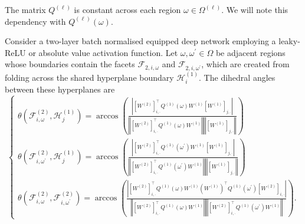 The matrix $Q^{(\ell)}$ is constant across each region $\omega\in\Omega^{(\ell)}$. We will note this dependency with $Q^{(\ell)}(\omega)$.

\begin{theorem}\label{thm:effect_std_bn_multilayer}
    Consider a two-layer batch normalised equipped deep network employing a leaky-ReLU or absolute value activation function. Let $\omega,\omega^\prime\in\Omega$ be adjacent regions whose boundaries contain the facets $\mathcal{F}_{2,i,\omega}$ and $\mathcal{F}_{2,i,\omega^\prime}$, which are created from folding across the shared hyperplane boundary $\mathcal{H}^{(1)}_i$. The dihedral angles between these hyperplanes are $$\begin{cases}\theta\left(\mathcal{F}^{(2)}_{i,\omega},\mathcal{H}^{(1)}_j\right)=\arccos\left(\frac{\left\vert\left[W^{(2)}\right]_{i,\cdot}^\top Q^{(1)}(\omega)W^{(1)}\left[W^{(1)}\right]_{j,\cdot}\right\vert}{\left\Vert\left[W^{(2)}\right]_{i,\cdot}^\top Q^{(1)}(\omega)W^{(1)}\right\Vert\left\Vert\left[W^{(1)}\right]_{j,\cdot}\right\Vert}\right)\\\theta\left(\mathcal{F}^{(2)}_{i,\omega^\prime},\mathcal{H}^{(1)}_j\right)=\arccos\left(\frac{\left\vert\left[W^{(2)}\right]_{i,\cdot}^\top Q^{(1)}(\omega^\prime)W^{(1)}\left[W^{(1)}\right]_{j,\cdot}\right\vert}{\left\Vert\left[W^{(2)}\right]_{i,\cdot}^\top Q^{(1)}\left(\omega^\prime\right)W^{(1)}\right\Vert\left\Vert\left[W^{(1)}\right]_{j,\cdot}\right\Vert}\right)\\\theta\left(\mathcal{F}^{(2)}_{i,\omega},\mathcal{F}^{(2)}_{i,\omega^\prime}\right)=\arccos\left(\frac{\left\vert\left[W^{(2)}\right]_{i,\cdot}^\top Q^{(1)}(\omega)W^{(1)}\left(W^{(1)}\right)^\top Q^{(1)}\left(\omega^\prime\right)\left[W^{(2)}\right]_{i,\cdot}\right\vert}{\left\Vert\left[W^{(2)}\right]_{i,\cdot}^\top Q^{(1)}(\omega)W^{(1)}\right\Vert\left\Vert\left[W^{(2)}\right]_{i,\cdot}^\top Q^{(1)}\left(\omega^\prime\right)W^{(1)}\right\Vert}\right).\end{cases}$$
\end{theorem}


